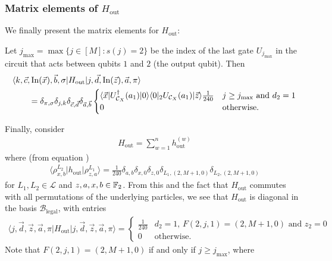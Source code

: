 \documentclass[../thesis-main/thesis-main]{subfiles}
\begin{document}
\subsubsection{Matrix elements of $H_{\text{out}}$}

We finally present the matrix elements for $H_{\text{out}}$:

\begin{mdframed}[frametitle=Matrix elements of $H_{\text{out}}$]
Let $j_{\max}=\max\{j\in[M]\colon s(j)=2\}$ be the index of the last gate $U_{j_{\max}}$ in the circuit that acts between qubits $1$ and $2$ (the output qubit). Then
\begin{align}
&\langle k,\vec{c},\operatorname{In}(\vec{x}),\vec{b},\sigma|H_{\text{out}}|j,\vec{d},\operatorname{In}(\vec{z}),\vec{a},\pi\rangle\nonumber\\
&\qquad=\delta_{\pi,\sigma}\delta_{j,k}\delta_{\vec{c},\vec{d}}\delta_{\vec{a},\vec{b}}\begin{cases}
\langle\vec{x}|U_{\mathcal{C}_X}^{\dagger}(a_{1})|0\rangle\langle0|_{2}U_{\mathcal{C}_X}(a_{1})|\vec{z}\rangle\frac{1}{240} & j\geq j_{\max}\text{ and }d_{2}=1\\
0 & \text{otherwise}.
\end{cases}\label{eq:hout_matels-1}
\end{align}
\end{mdframed}
Finally, consider 
\begin{align}
H_{{\text{out}}}=\sum_{w=1}^{n}h_{{\text{out}}}^{(w)}
\end{align}
where (from equation )
\begin{align}
\langle\rho_{x,b}^{L_{2}}|h_{{\text{out}}}|\rho_{z,a}^{L_{1}}\rangle=\frac{1}{240}\delta_{a,b}\delta_{x,0}\delta_{z,0}\delta_{L_{1},(2,M+1,0)}\delta_{L_{2},(2,M+1,0)}
\end{align}
for $L_{1},L_{2}\in\mathcal{L}$ and $z,a,x,b\in\mathbb{F}_2$. From this and the fact that $H_{\text{out}}$ commutes with all permutations of the underlying particles, we see that $H_{{\text{out}}}$ is diagonal in the basis $\mathcal{B}_{{\text{legal}}}$, with entries 
\begin{align}
\langle j,\vec{d},\vec{z},\vec{a},\pi|H_{{\text{out}}}|j,\vec{d},\vec{z},\vec{a},\pi\rangle=\begin{cases}
\frac{1}{240} & d_{2}=1\text{, }F(2,j,1)=(2,M+1,0)\text{ and }z_{2}=0\\
0 & \text{otherwise}.
\end{cases}
\end{align}
Note that $F(2,j,1)=(2,M+1,0)$ if and only if $j\geq j_{\max}$, where 
\end{document}
